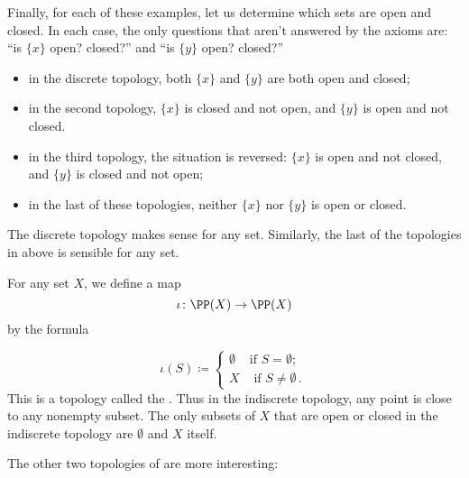 \begin{exm}
	Finally, for each of these examples, let us determine which sets are open and closed.
	In each case, the only questions that aren't answered by the axioms are: \enquote{is $ \{ x \} $ open? closed?} and \enquote{is $ \{ y \} $ open? closed?}
	\begin{itemize}
		\item in the discrete topology, both $ \{ x \} $ and $ \{ y \} $ are both open and closed;
		\item in the second topology, $ \{ x \} $ is closed and not open, and $ \{ y \} $ is open and not closed.
		\item in the third topology, the situation is reversed: $ \{ x \} $ is open and not closed, and $ \{ y \} $ is closed and not open;
		\item in the last of these topologies, neither $ \{ x \} $ nor $ \{ y \} $ is open or closed.
	\end{itemize}
\end{exm}

The discrete topology makes sense for any set.
Similarly, the last of the topologies in  above is sensible for any set.

\begin{exm}
	For any set $ X $, we define a map
	\[
		\iota \colon \PP(X) \to \PP(X)
	\]
	by the formula

	\[
		\iota( S ) \coloneq
		\begin{cases}
			\emptyset & \text{if } S = \emptyset \semicolon \\
			X & \text{ if } S \neq \emptyset \period
		\end{cases}
	\]
	This is a topology called the .
	Thus in the indiscrete topology, any point is close to any nonempty subset.
	The only subsets of $ X $ that are open or closed in the indiscrete topology are $ \emptyset $ and $ X $ itself.
\end{exm}

The other two topologies of  are more interesting:

